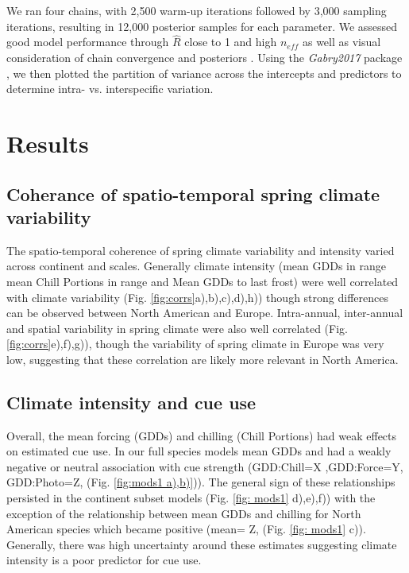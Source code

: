 \documentclass[12pt]{article}\usepackage[]{graphicx}\usepackage[]{color}
\begin{document}
We ran four chains, with 2,500 warm-up iterations followed by 3,000 sampling iterations, resulting in 12,000 posterior samples for each parameter. We assessed good model performance through $\hat{R}$ close to 1 and high $n_{eff}$ as well as visual consideration of chain convergence and posteriors \citep{Gelman2006}. Using the \textit{Gabry2017} package \citep{bayesplot}, we then plotted the partition of variance across the intercepts and predictors to determine intra- vs. interspecific variation.  



\section*{Results}

\subsection*{Coherance of spatio-temporal spring climate variability}
The spatio-temporal coherence of spring climate variability and intensity varied across continent and scales. Generally climate intensity (mean GDDs in range mean Chill Portions in range and Mean GDDs to last frost) were well correlated with climate variability (Fig. \ref{fig:corrs}a),b),c),d),h)) though strong differences can be observed between North American and Europe.  Intra-annual, inter-annual and spatial variability in spring climate were also well correlated  (Fig. \ref{fig:corrs}e),f),g)), though the variability of spring climate in Europe was very low, suggesting that these correlation are likely more relevant in North America.

\subsection*{Climate intensity and cue use}
Overall, the mean forcing (GDDs) and chilling (Chill Portions) had weak effects on estimated cue use. 
In our full species models mean GDDs and had a weakly negative or neutral association with cue strength (GDD:Chill=X ,GDD:Force=Y, GDD:Photo=Z, (Fig. \ref{fig:mods1 a),b)})). The general sign of these relationships persisted in the continent subset models (Fig. \ref{fig: mods1} d),e),f)) with the exception of the relationship between mean GDDs and chilling for North American species which became positive (mean= Z, (Fig. \ref{fig: mods1} c)). Generally, there was high uncertainty around these estimates suggesting climate intensity is a poor predictor for cue use. 
\end{document}
